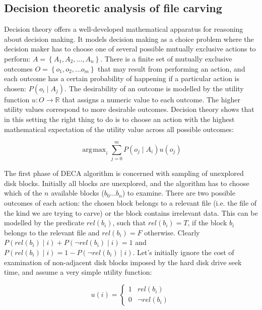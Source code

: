 \documentclass[10pt,a4paper]{article}
\DeclareMathOperator*{\argmax}{\arg\!\max}
\begin{document}
\subsection{Decision theoretic analysis of file carving}

Decision theory offers a well-developed mathematical apparatus for reasoning about decision making. It models decision making as a choice problem where the decision maker has to choose one of several possible mutually exclusive actions to perform: $A=\left\{A_1,A_2,\dots,A_n\right\}$. There is a finite set of mutually exclusive outcomes $O=\left\{o_1,o_2,\dots o_m \right\}$ that may result from performing an action, and each outcome has a certain probability of happening if a particular action is chosen: $P(o_i \mid A_j)$. The desirability of an outcome is modelled by the utility function $u: O \rightarrow \mathbb{R}$ that assigns a numeric value to each outcome. The higher utility values correspond to more desirable outcomes. Decision theory shows that in this setting the right thing to do is to choose an action with the highest mathematical expectation of the utility value across all possible outcomes:

\begin{equation} \label{eq:decision}
\argmax_{i}\sum_{j=0}^m P(o_j \mid A_i )u(o_j)
\end{equation}

The first phase of DECA algorithm is concerned with sampling of unexplored disk blocks. Initially all blocks are unexplored, and the algorithm has to choose which of the $n$ available blocks ($b_0 \dots b_n$) to examine. There are two possible outcomes of each action: the chosen block belongs to a relevant file (i.e. the file of the kind we are trying to carve) or the block contains irrelevant data. This can be modelled by the predicate $rel(b_i)$, such that $rel(b_i) = T$, if the block $b_i$ belongs to the relevant file and $rel(b_i) = F$ otherwise. Clearly $P(rel(b_i) \mid i) + P(\neg rel(b_i) \mid i) = 1$ and $P(rel(b_i) \mid i) = 1-P(\neg rel(b_i) \mid i)$.  Let's initially ignore the cost of examination of non-adjacent disk blocks imposed by the hard disk drive seek time, and assume a very simple utility function:

\begin{equation}
u(i)= \begin{cases}
      1 & rel(b_i) \\
      0 & \neg rel(b_i)
      \end{cases} 
\end{equation}
\end{document}
